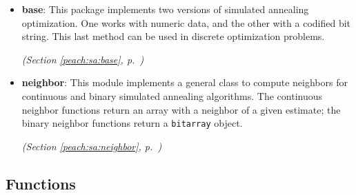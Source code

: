 \begin{itemize}
\setlength{\parskip}{0ex}
\item \textbf{base}: 
This package implements two versions of simulated annealing optimization. One
works with numeric data, and the other with a codified bit string. This last
method can be used in discrete optimization problems.


  \textit{(Section \ref{peach:sa:base}, p.~\pageref{peach:sa:base})}

\item \textbf{neighbor}: 
This module implements a general class to compute neighbors for continuous and
binary simulated annealing algorithms. The continuous neighbor functions return
an array with a neighbor of a given estimate; the binary neighbor functions
return a \texttt{bitarray} object.


  \textit{(Section \ref{peach:sa:neighbor}, p.~\pageref{peach:sa:neighbor})}

\end{itemize}



  \subsection{Functions}

    \label{peach:standard_normal}

    \vspace{0.5ex}

